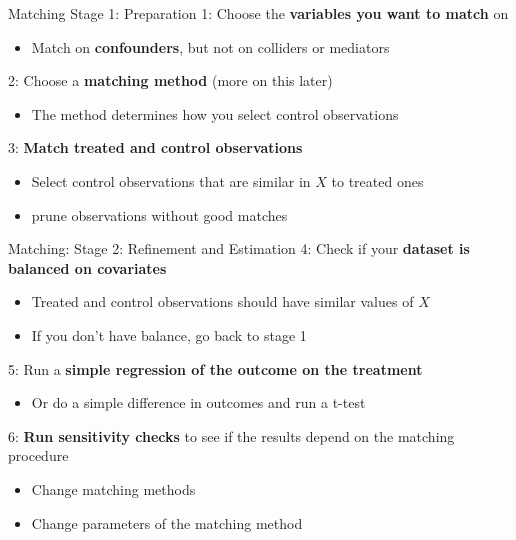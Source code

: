 \documentclass[
  ignorenonframetext,
  aspectratio=169, handout]{beamer}
\providecommand{\tightlist}{%
  \setlength{\itemsep}{0pt}\setlength{\parskip}{0pt}}
\newcommand{\brf}[1]{\textcolor{brickred}{\textbf{#1}}}
\begin{document}
\begin{frame}{Matching Stage 1: Preparation}
\protect\hypertarget{matching-stage-1-preparation}{}
1: Choose the \textbf{variables you want to match} on

\begin{itemize}
\tightlist
\item
  Match on \textbf{confounders}, but not on colliders or mediators
\end{itemize}

\vfill

2: Choose a \textbf{matching method} (more on this later)

\begin{itemize}
\tightlist
\item
  The method determines how you select control observations
\end{itemize}

\vfill

3: \textbf{Match treated and control observations}

\begin{itemize}
\tightlist
\item
  Select control observations that are similar in \(X\) to treated ones
\item
  prune observations without good matches
\end{itemize}
\end{frame}

\begin{frame}{Matching: Stage 2: Refinement and Estimation}
\protect\hypertarget{matching-stage-2-refinement-and-estimation}{}
4: Check if your \brf{dataset is balanced on covariates}

\begin{itemize}
\tightlist
\item
  Treated and control observations should have similar values of \(X\)
\item
  If you don't have balance, go back to stage 1
\end{itemize}

\vfill

5: Run a \brf{simple regression of the outcome on the treatment}

\begin{itemize}
\tightlist
\item
  Or do a simple difference in outcomes and run a t-test
\end{itemize}

\vfill

6: \brf{Run sensitivity checks} to see if the results depend on the
matching procedure

\begin{itemize}
\tightlist
\item
  Change matching methods
\item
  Change parameters of the matching method
\end{itemize}
\end{frame}
\end{document}
